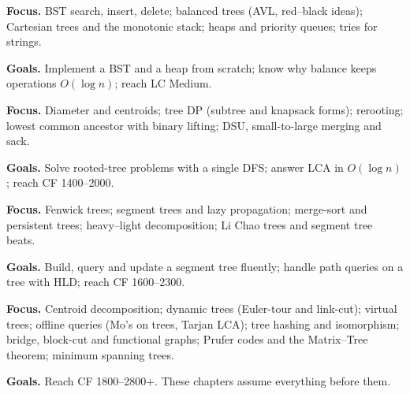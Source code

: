 \begin{tcolorbox}[enhanced, breakable, colback=lightgray, colframe=successgreen, title={Intermediate track -- Chapters 7--11 (3--4 weeks)}]
\textbf{Focus.} BST search, insert, delete; balanced trees (AVL, red--black ideas); Cartesian trees and the monotonic stack; heaps and priority queues; tries for strings.\par
\textbf{Goals.} Implement a BST and a heap from scratch; know why balance keeps operations $O(\log n)$; reach LC Medium.
\end{tcolorbox}

\begin{tcolorbox}[enhanced, breakable, colback=lightgray, colframe=accentorange, title={Advanced track -- Chapters 12--17 (4--5 weeks)}]
\textbf{Focus.} Diameter and centroids; tree DP (subtree and knapsack forms); rerooting; lowest common ancestor with binary lifting; DSU, small-to-large merging and sack.\par
\textbf{Goals.} Solve rooted-tree problems with a single DFS; answer LCA in $O(\log n)$; reach CF 1400--2000.
\end{tcolorbox}

\begin{tcolorbox}[enhanced, breakable, colback=lightgray, colframe=softpurple, title={Query-structure track -- Chapters 18--23 (4--5 weeks)}]
\textbf{Focus.} Fenwick trees; segment trees and lazy propagation; merge-sort and persistent trees; heavy--light decomposition; Li Chao trees and segment tree beats.\par
\textbf{Goals.} Build, query and update a segment tree fluently; handle path queries on a tree with HLD; reach CF 1600--2300.
\end{tcolorbox}

\begin{tcolorbox}[enhanced, breakable, colback=lightgray, colframe=deepblue, title={Expert track -- Chapters 24--31 (5--6 weeks)}]
\textbf{Focus.} Centroid decomposition; dynamic trees (Euler-tour and link-cut); virtual trees; offline queries (Mo's on trees, Tarjan LCA); tree hashing and isomorphism; bridge, block-cut and functional graphs; Prufer codes and the Matrix--Tree theorem; minimum spanning trees.\par
\textbf{Goals.} Reach CF 1800--2800+. These chapters assume everything before them.
\end{tcolorbox}
